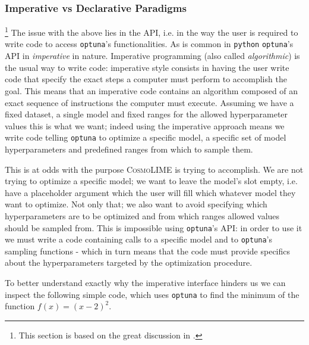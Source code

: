 \subsubsection{Imperative vs Declarative Paradigms}\footnote{This section is based on the great discussion in \cite{imperative_declarative}.}
The issue with the above lies in the API, i.e. in the way the user is required to write code to access \texttt{optuna}'s functionalities. As is common in \texttt{python} \texttt{optuna}'s API in \emph{imperative} in nature. Imperative programming (also called \emph{algorithmic}) is the usual way to write code: imperative style consists in having the user write code that specify the exact steps a computer must perform to accomplish the goal. This means that an imperative code contains an algorithm composed of an exact sequence of instructions the computer must execute. Assuming we have a fixed dataset, a single model and fixed ranges for the allowed hyperparameter values this is what we want; indeed using the imperative approach means we write code telling \texttt{optuna} to optimize a specific model, a specific set of model hyperparameters and predefined ranges from which to sample them.


This is at odds with the purpose \textsc{CosmoLIME} is trying to accomplish. We are not trying to optimize a specific model; we want to leave the model's slot empty, i.e. have a placeholder argument which the user will fill which whatever model they want to optimize. Not only that; we also want to avoid specifying which hyperparameters are to be optimized and from which ranges allowed values should be sampled from.
This is impossible using \texttt{optuna}'s API: in order to use it we must write a code containing calls to a specific model and to \texttt{optuna}'s sampling functions - which in turn means that the code must provide specifics about the hyperparameters targeted by the optimization procedure.

To better understand exactly why the imperative interface hinders us we can inspect the following simple code, which uses \texttt{optuna} to find the minimum of the function $f(x) = (x - 2)^2$.

